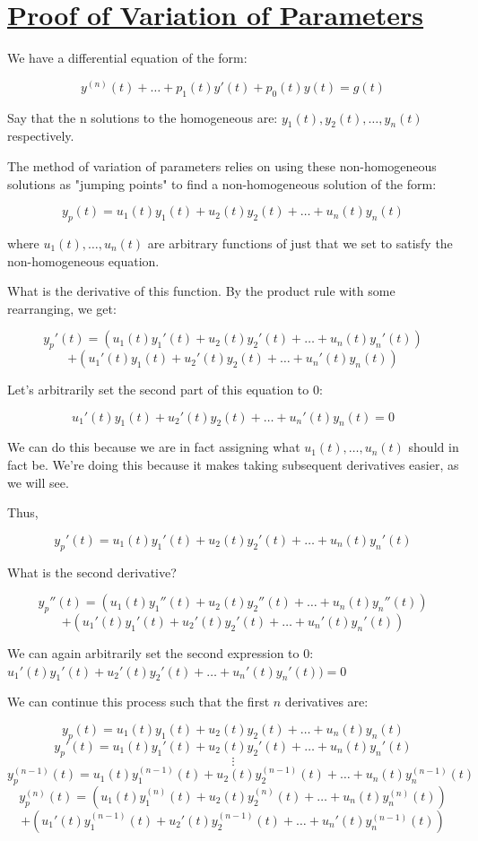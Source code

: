 \documentclass{report}
\begin{document}
\section{\hyperref[th:var]{Proof of Variation of Parameters}}
\label{sec:prVar}
We have a differential equation of the form:

$$y^{(n)}(t) + \dots + p_1(t)y'(t) + p_0(t)y(t) = g(t)$$

Say that the n solutions to the homogeneous are:
$y_1(t), y_2(t), \dots, y_n(t)$ respectively.

The method of variation of parameters relies on using these non-homogeneous solutions as "jumping points" to find a non-homogeneous solution of the form:

$$y_p(t) = u_1(t)y_1(t) + u_2(t)y_2(t) + \dots + u_n(t)y_n(t)$$

where $u_1(t), \dots, u_n(t)$ are arbitrary functions of just that we set to satisfy the non-homogeneous equation.

What is the derivative of this function. By the product rule with some rearranging, we get:

$$y_p'(t) = (u_1(t)y_1'(t) + u_2(t)y_2'(t) + \dots
+ u_n(t)y_n'(t)) $$  $$+ (u_1'(t)y_1(t) + u_2'(t)y_2(t) + \dots + u_n'(t)y_n(t))$$

Let's arbitrarily set the second part of this equation to 0:

$$u_1'(t)y_1(t) + u_2'(t)y_2(t) + \dots + u_n'(t)y_n(t) = 0$$

We can do this because we are in fact assigning what $u_1(t), \dots, u_n(t)$ should in fact be. We're doing this because it makes taking subsequent derivatives easier, as we will see.

Thus,

$$y_p'(t) = u_1(t)y_1'(t) + u_2(t)y_2'(t) + \dots + u_n(t)y_n'(t)$$

What is the second derivative?

$$y_p''(t) = (u_1(t)y_1''(t) + u_2(t)y_2''(t) + \dots + u_n(t)y_n''(t))$$ 
$$ +  (u_1'(t)y_1'(t) + u_2'(t)y_2'(t) + \dots + u_n'(t)y_n'(t))$$

We can again arbitrarily set the second expression to 0:
$u_1'(t)y_1'(t) + u_2'(t)y_2'(t) + \dots + u_n'(t)y_n'(t)) = 0$

We can continue this process such that the first $n$ derivatives are:

$$y_p(t) = u_1(t)y_1(t) + u_2(t)y_2(t) + \dots + u_n(t)y_n(t)$$
$$y_p'(t) = u_1(t)y_1'(t) + u_2(t)y_2'(t) + \dots + u_n(t)y_n'(t)$$
$$\vdots$$
$$y_p^{(n-1)}(t) = u_1(t)y_1^{(n-1)}(t) + u_2(t)y_2^{(n-1)}(t) + \dots + u_n(t)y_n^{(n-1)}(t)$$
$$y_p^{(n)}(t) = (u_1(t)y_1^{(n)}(t) + u_2(t)y_2^{(n)}(t) + \dots + u_n(t)y_n^{(n)}(t))$$
$$+ (u_1'(t)y_1^{(n-1)}(t) + u_2'(t)y_2^{(n-1)}(t) + \dots + u_n'(t)y_n^{(n-1)}(t))$$
\end{document}
